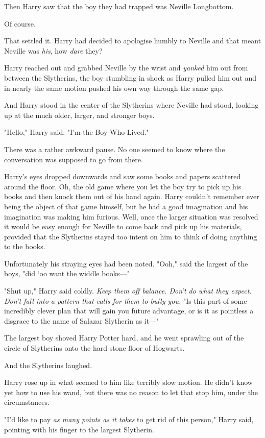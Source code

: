 Then Harry saw that the boy they had trapped was Neville Longbottom.

Of course.

That settled it. Harry had decided to apologise humbly to Neville and that 
meant Neville was \emph{his}, how \emph{dare} they?

Harry reached out and grabbed Neville by the wrist and \emph{yanked} him out 
from between the Slytherins, the boy stumbling in shock as Harry pulled him out 
and in nearly the same motion pushed his own way through the same gap.

And Harry stood in the center of the Slytherins where Neville had stood, 
looking up at the much older, larger, and stronger boys.

"Hello," Harry said. "I'm the Boy-Who-Lived."

There was a rather awkward pause. No one seemed to know where the conversation 
was supposed to go from there.

Harry's eyes dropped downwards and saw some books and papers scattered around 
the floor. Oh, the old game where you let the boy try to pick up his books and 
then knock them out of his hand again. Harry couldn't remember ever being the 
object of that game himself, but he had a good imagination and his imagination 
was making him furious. Well, once the larger situation was resolved it would 
be easy enough for Neville to come back and pick up his materials, provided 
that the Slytherins stayed too intent on him to think of doing anything to the 
books.

Unfortunately his straying eyes had been noted. "Ooh," said the largest of the 
boys, "did `oo want the widdle books---"

"Shut up," Harry said coldly. \emph{Keep them off balance. Don't do what they 
expect. Don't fall into a pattern that calls for them to bully you.} "Is this 
part of some incredibly clever plan that will gain you future advantage, or is 
it as pointless a disgrace to the name of Salazar Slytherin as it---"

The largest boy shoved Harry Potter hard, and he went sprawling out of the 
circle of Slytherins onto the hard stone floor of Hogwarts.

And the Slytherins laughed.

Harry rose up in what seemed to him like terribly slow motion. He didn't know 
yet how to use his wand, but there was no reason to let that stop him, under 
the circumstances.

"I'd like to pay \emph{as many points as it takes} to get rid of this person," 
Harry said, pointing with his finger to the largest Slytherin.

